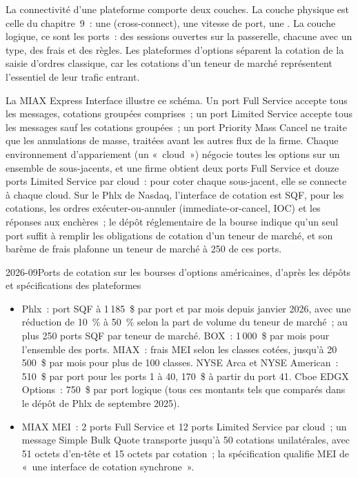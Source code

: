 La connectivité d'une plateforme comporte deux couches. La couche physique est celle du chapitre~9~: une  (cross-connect), une vitesse de port, une
. La couche logique, ce sont les ports~: des sessions ouvertes sur la passerelle, chacune avec un type, des frais et des règles. Les plateformes d'options
séparent la cotation de la saisie d'ordres classique, car les cotations d'un teneur de marché représentent l'essentiel de leur trafic entrant.

La MIAX Express Interface illustre ce schéma. Un port Full Service accepte tous les messages, cotations groupées comprises~; un port Limited
Service accepte tous les messages sauf les cotations groupées~; un port Priority Mass Cancel ne traite que les annulations de masse, traitées avant les
autres flux de la firme. Chaque environnement d'appariement (un «~cloud~») négocie toutes les options sur un ensemble de sous-jacents, et une firme obtient
deux ports Full Service et douze ports Limited Service par cloud~: pour coter chaque sous-jacent, elle se connecte à chaque cloud. Sur
le Phlx de Nasdaq, l'interface de cotation est SQF, pour les cotations, les ordres exécuter-ou-annuler (immediate-or-cancel, IOC) et les réponses aux enchères~; le
dépôt réglementaire de la bourse indique qu'un seul port suffit à remplir les obligations de cotation d'un teneur de marché, et son barème de frais
plafonne un teneur de marché à 250 de ces ports.

\begin{dated}{2026-09}{Ports de cotation sur les bourses d'options américaines, d'après les dépôts et spécifications des plateformes}\label{dat:nw:equities-and-options-connectivity:ports}
\begin{itemize}
\item Phlx~: port SQF à 1\,185~\$ par port et par mois depuis janvier 2026, avec une réduction de 10~\% à 50~\% selon la part de volume du teneur de marché~; au plus 250
  ports SQF par teneur de marché. BOX~: 1\,000~\$ par mois pour l'ensemble des ports. MIAX~: frais MEI selon les classes cotées, jusqu'à 20\,500~\$ par mois
  pour plus de 100 classes. NYSE Arca et NYSE American~: 510~\$ par port pour les ports 1 à 40, 170~\$ à partir du port 41. Cboe EDGX Options~:
  750~\$ par port logique (tous ces montants tels que comparés dans le dépôt de Phlx de septembre 2025).
\item MIAX MEI~: 2 ports Full Service et 12 ports Limited Service par cloud~; un message Simple Bulk Quote transporte jusqu'à 50
  cotations unilatérales, avec 51 octets d'en-tête et 15 octets par cotation~; la spécification qualifie MEI de «~une interface
  de cotation synchrone~».
\end{itemize}
\end{dated}

